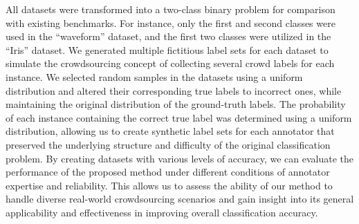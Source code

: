 All datasets were transformed into a two-class binary problem for comparison with existing benchmarks. For instance, only the first and second classes were used in the ``waveform'' dataset, and the first two classes were utilized in the ``Iris'' dataset.
We generated multiple fictitious label sets for each dataset to simulate the crowdsourcing concept of collecting several crowd labels for each instance. We selected random samples in the datasets using a uniform distribution and altered their corresponding true labels to incorrect ones, while maintaining the original distribution of the ground-truth labels. The probability of each instance containing the correct true label was determined using a uniform distribution, allowing us to create synthetic label sets for each annotator that preserved the underlying structure and difficulty of the original classification problem. By creating datasets with various levels of accuracy, we can evaluate the performance of the proposed method under different conditions of annotator expertise and reliability. This allows us to assess the ability of our method to handle diverse real-world crowdsourcing scenarios and gain insight into its general applicability and effectiveness in improving overall classification accuracy.

